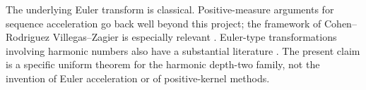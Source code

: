 The underlying Euler transform is classical. Positive-measure arguments for sequence acceleration go back well beyond this project; the framework of Cohen--Rodriguez Villegas--Zagier is especially relevant \cite{CRVZ}. Euler-type transformations involving harmonic numbers also have a substantial literature \cite{Boyadzhiev}. The present claim is a specific uniform theorem for the harmonic depth-two family, not the invention of Euler acceleration or of positive-kernel methods.
